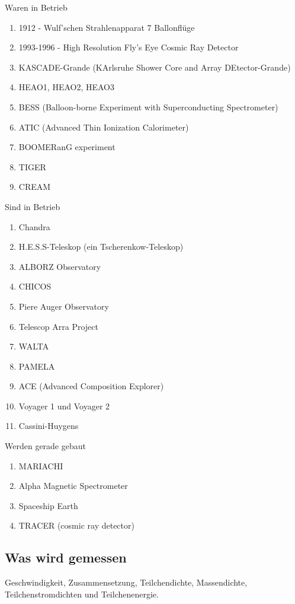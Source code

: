 \begin{description}
    \item Waren in Betrieb
	\begin{enumerate}
		\item 1912 - Wulf'schen Strahlenapparat 7 Ballonflüge 
		\item 1993-1996 - High Resolution Fly's Eye Cosmic Ray Detector
		\item KASCADE-Grande (KArlsruhe Shower Core and Array DEtector-Grande)
		\item HEAO1, HEAO2, HEAO3
		\item BESS (Balloon-borne Experiment with Superconducting Spectrometer)
		\item ATIC (Advanced Thin Ionization Calorimeter)
		\item BOOMERanG experiment
		\item TIGER
		\item CREAM
	\end{enumerate}
	\item Sind in Betrieb
	\begin{enumerate}
		\item Chandra
		\item H.E.S.S-Teleskop (ein Tscherenkow-Teleskop)
		\item ALBORZ Observatory
		\item CHICOS
		\item Piere Auger Observatory
		\item Telescop Arra Project
		\item WALTA
		\item PAMELA
		\item ACE (Advanced Composition Explorer)
		\item Voyager 1 und Voyager 2
		\item Cassini-Huygens
	\end{enumerate}
	\item Werden gerade gebaut
	\begin{enumerate}
		\item MARIACHI
		\item Alpha Magnetic Spectrometer
		\item Spaceship Earth
		\item TRACER (cosmic ray detector)
	\end{enumerate}
\end{description}

\subsection{Was wird gemessen}
Geschwindigkeit, Zusammensetzung, Teilchendichte, Massendichte, Teilchenstromdichten und Teilchenenergie.
